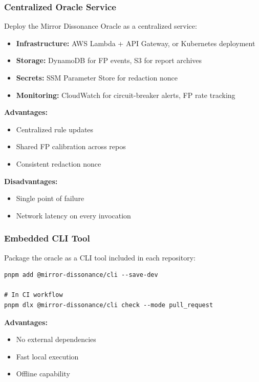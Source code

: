 \documentclass[11pt,a4paper]{article}
\begin{document}
\subsubsection{Centralized Oracle Service}

Deploy the Mirror Dissonance Oracle as a centralized service:

\begin{itemize}
\item \textbf{Infrastructure:} AWS Lambda + API Gateway, or Kubernetes deployment
\item \textbf{Storage:} DynamoDB for FP events, S3 for report archives
\item \textbf{Secrets:} SSM Parameter Store for redaction nonce
\item \textbf{Monitoring:} CloudWatch for circuit-breaker alerts, FP rate tracking
\end{itemize}

\textbf{Advantages:}
\begin{itemize}
\item Centralized rule updates
\item Shared FP calibration across repos
\item Consistent redaction nonce
\end{itemize}

\textbf{Disadvantages:}
\begin{itemize}
\item Single point of failure
\item Network latency on every invocation
\end{itemize}

\subsubsection{Embedded CLI Tool}

Package the oracle as a CLI tool included in each repository:

\begin{verbatim}
pnpm add @mirror-dissonance/cli --save-dev

# In CI workflow
pnpm dlx @mirror-dissonance/cli check --mode pull_request
\end{verbatim}

\textbf{Advantages:}
\begin{itemize}
\item No external dependencies
\item Fast local execution
\item Offline capability
\end{itemize}
\end{document}
